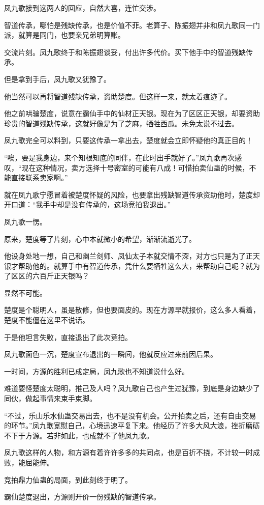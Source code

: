 \begin{this_body}
凤九歌接到这两人的回应，自然大喜，连忙交涉。

智道传承，哪怕是残缺传承，也是价值不菲。老算子、陈振翅并非和凤九歌同一门派，就算是同门，也要亲兄弟明算账。

交流片刻。凤九歌终于和陈振翅谈妥，付出许多代价。买下他手中的智道残缺传承。

但是拿到手后，凤九歌又犹豫了。

他当然可以再将智道残缺传承，资助楚度。但这样一来，就太着痕迹了。

他之前哄骗楚度，说意在霸仙手中的仙材正天银。现在为了区区正天银，却要资助珍贵的智道残缺传承，这就好像是为了芝麻，牺牲西瓜。未免太说不过去。

凤九歌完全可以料到，只要这传承一拿出去，楚度就会立即怀疑他的真正目的！

“唉，要是我身边，来个知根知底的同伴，在此时出手就好了。”凤九歌再次感叹，“现在这种情况，卖方选择十号密室的可能有八成！可惜拍卖仙蛊的时候，不能直接联系卖家啊。”

就在凤九歌宁愿冒着被楚度怀疑的风险，也要拿出残缺智道传承资助他时，楚度却开口道：“我手中却是没有传承的，这场竞拍我退出。”

凤九歌一愣。

原来，楚度等了片刻，心中本就微小的希望，渐渐流逝光了。

他设身处地一想，自己和幽兰剑师、凤仙太子本就交情不深，对方也只是为了正天银才帮助他的。就算手中有智道传承，凭什么要牺牲这么大，来帮助自己呢？就为了区区的六百斤正天银吗？

显然不可能。

楚度是个聪明人，虽是散修，但也要面皮的。现在方源早就报价，这么多人看着，楚度不能僵在这里不说话。

于是他坦言失败，直接退出了此次竞拍。

凤九歌面色一沉，楚度宣布退出的一瞬间，他就反应过来前因后果。

一时间，方源的胜利已成定局，凤九歌也不知道说什么好。

难道要怪楚度太聪明，推己及人吗？凤九歌自己也产生过犹豫，到底是身边缺少了同伙，做起事情来束手束脚。

“不过，乐山乐水仙蛊交易出去，也不是没有机会。公开拍卖之后，还有自由交易的环节。”凤九歌宽慰自己，心境迅速平复下来。他经历了许多大风大浪，挫折磨砺不下于方源。若非如此，也成就不了他凤九歌。

凤九歌这样的人物，和方源有着许许多多的共同点，也是百折不挠，不计较一时成败，能屈能伸。

竞拍鼎力仙蛊的局面，到此刻终于明了。

霸仙楚度退出，方源则开价一份残缺的智道传承。


\end{this_body}
